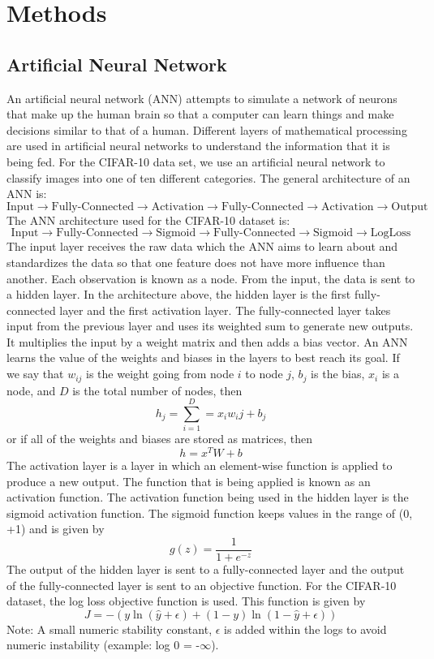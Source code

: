 \section{Methods}
\label{sec:methods}

\subsection{Artificial Neural Network}
\label{sec:methods:Artificial Neural Network}

An artificial neural network (ANN) attempts to simulate a network of neurons that make up the human brain so that a computer can learn things and make decisions similar to that of a human. Different layers of mathematical processing are used in artificial neural networks to understand the information that it is being fed. For the CIFAR-10 data set, we use an artificial neural network to classify images into one of ten different categories.
The general architecture of an ANN is:
$$\text{Input} \rightarrow \text{Fully-Connected} \rightarrow \text{Activation} \rightarrow \text{Fully-Connected} \rightarrow \text{Activation} \rightarrow \text{Output}$$
The ANN architecture used for the CIFAR-10 dataset is:
$$\text{Input} \rightarrow \text{Fully-Connected} \rightarrow \text{Sigmoid} \rightarrow \text{Fully-Connected} \rightarrow \text{Sigmoid} \rightarrow \text{LogLoss}$$
The input layer receives the raw data which the ANN aims to learn about and standardizes the data so that one feature does not have more influence than another. Each observation is known as a node. From the input, the data is sent to a hidden layer. In the architecture above, the hidden layer is the first fully-connected layer and the first activation layer. The fully-connected layer takes input from the previous layer and uses its weighted sum to generate new outputs. It multiplies the input by a weight matrix and then adds a bias vector. An ANN learns the value of the weights and biases in the layers to best reach its goal. If we say that $w_{ij}$ is the weight going from node $i$ to node $j$, $b_j$ is the bias, $x_i$ is a node, and $D$ is the total number of nodes, then 
$$h_j = \sum_{i=1}^{D}  = x_i w_ij + b_j$$ 
or if all of the weights and biases are stored as matrices, then
$$h = x^T W + b$$
The activation layer is a layer in which an element-wise function is applied to produce a new output. The function that is being applied is known as an activation function. The activation function being used in the hidden layer is the sigmoid activation function. The sigmoid function keeps values in the range of (0, +1) and is given by 
$$g(z) = \frac{1}{1+e^{-z}}$$
The output of the hidden layer is sent to a fully-connected layer and the output of the fully-connected layer is sent to an objective function. For the CIFAR-10 dataset, the log loss objective function is used. This function is given by
$$J = -(y\ln(\hat{y} + \epsilon) + (1-y)\ln(1-\hat{y} + \epsilon))$$
Note: A small numeric stability constant, $\epsilon$ is added within the logs to avoid numeric instability (example: log 0 = -$\infty$).\\

